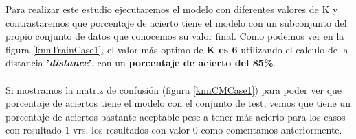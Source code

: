 Para realizar este estudio ejecutaremos el modelo con diferentes valores de K y contrastaremos que porcentaje de acierto tiene el modelo con un subconjunto del propio conjunto de datos que conocemos su valor final. Como podemos ver en la figura \ref{knnTrainCase1}, el valor más optimo de \textbf{K es 6} utilizando el calculo de la distancia \textbf{'\textit{distance}'}, con un \textbf{porcentaje de acierto del 85\%}.

\paragraph{}
Si mostramos la matriz de confusión\cite{ref:confusion_matrix} (figura \ref{knnCMCase1}) para poder ver que porcentaje de aciertos tiene el modelo con el conjunto de test, vemos que tiene un porcentaje de aciertos bastante aceptable pese a tener más acierto para los casos con resultado 1 vrs. los resultados con valor 0 como comentamos anteriormente.

